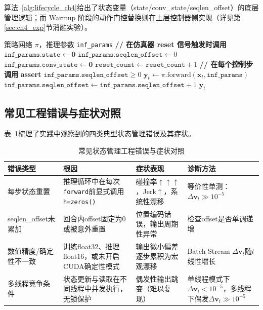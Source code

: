 算法~\ref{alg:lifecycle_ch4}给出了状态变量（state/conv\_state/seqlen\_offset）的底层管理逻辑；而 Warmup 阶段的动作门控替换则在上层控制器侧实现（详见第\ref{sec:ch4_exp}节消融实验）。
\begin{algorithm}[htbp]
\caption{回合边界级状态生命周期管理}
\label{alg:lifecycle_ch4}
\begin{algorithmic}[1]
\Require 策略网络 $\pi$，推理参数 \texttt{inf\_params}
\State \textbf{// 在仿真器 reset 信号触发时调用}
  \State $\texttt{inf\_params.state} \leftarrow \mathbf{0}$ 
  \State $\texttt{inf\_params.seqlen\_offset} \leftarrow 0$ 
  \State $\texttt{inf\_params.conv\_state} \leftarrow \mathbf{0}$ 
  \State $\texttt{reset\_count} \leftarrow \texttt{reset\_count} + 1$ 
\EndProcedure
\State
\State \textbf{// 在每个控制步调用}
  \State \textbf{assert} $\texttt{inf\_params.seqlen\_offset} \geq 0$ 
  \State $\mathbf{y}_t \leftarrow \pi.\text{forward}(\mathbf{x}_t, \texttt{inf\_params})$ 
  \State {}
  \State $\texttt{inf\_params.seqlen\_offset} \leftarrow \texttt{inf\_params.seqlen\_offset} + 1$
  \State \Return $\mathbf{y}_t$
\EndProcedure
\end{algorithmic}
\end{algorithm}

\subsection{常见工程错误与症状对照}

表~\ref{tab:common_bugs}梳理了实践中观察到的四类典型状态管理错误及其症状。

\begin{table}[htbp]
\centering
\caption{常见状态管理工程错误与症状对照}
\label{tab:common_bugs}
\begin{tabular}{p{3.2cm}p{3.5cm}p{3.0cm}p{2.8cm}}
\toprule
\textbf{错误类型} & \textbf{根因} & \textbf{症状表现} & \textbf{诊断方法} \\
\midrule
每步状态重置 & 推理循环中在每次\texttt{forward}前显式调用\texttt{h=zeros()} & 碰撞率$\uparrow\uparrow\uparrow$，Jerk$\uparrow$，系统性漂移 & 等价性单测：$\Delta\mathbf{v}_t \gg 10^{-5}$ \\
\midrule
seqlen\_offset未累加 & 回合内offset固定为0或被意外重置 & 位置编码错误，输出周期性异常 & 检查offset是否单调递增 \\
\midrule
数值精度/确定性不一致 & 训练float32、推理float16，或未开启CUDA确定性模式 & 输出微小偏差逐步累积为宏观漂移 & Batch-Stream $\Delta\mathbf{v}_t$随$t$线性增长 \\
\midrule
多线程竞争条件 & 状态更新与读取在不同线程中并发执行，无锁保护 & 偶发性输出跳变（难以复现） & 单线程模式下$\Delta\mathbf{v}_t < 10^{-5}$，多线程下偶发$\Delta\mathbf{v}_t \gg 10^{-5}$ \\
\bottomrule
\end{tabular}
\end{table}

